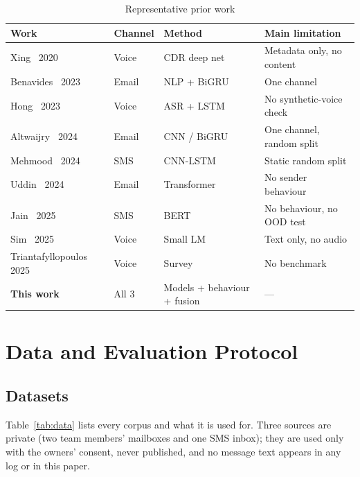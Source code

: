 \documentclass[conference]{IEEEtran}
\begin{document}
\begin{table}[t]
\caption{Representative prior work}
\label{tab:related}
\centering\footnotesize
\setlength{\tabcolsep}{3pt}
\begin{tabular}{@{}p{2.25cm}p{0.95cm}p{1.75cm}p{2.6cm}@{}}
\toprule
Work & Channel & Method & Main limitation \\
\midrule
Xing~\cite{xing2020fraudcall} 2020 & Voice & CDR deep net & Metadata only, no content \\
Benavides~\cite{benavides2023phishing} 2023 & Email & NLP + BiGRU & One channel \\
Hong~\cite{hong2023scamcalls} 2023 & Voice & ASR + LSTM & No synthetic-voice check \\
Altwaijry~\cite{altwaijry2024advancing} 2024 & Email & CNN / BiGRU & One channel, random split \\
Mehmood~\cite{mehmood2024smishing} 2024 & SMS & CNN-LSTM & Static random split \\
Uddin~\cite{uddin2024explainable} 2024 & Email & Transformer & No sender behaviour \\
Jain~\cite{jain2025smishing} 2025 & SMS & BERT & No behaviour, no OOD test \\
Sim~\cite{sim2025slm} 2025 & Voice & Small LM & Text only, no audio \\
Triantafyllopoulos~\cite{triantafyllopoulos2025vishing} 2025 & Voice & Survey & No benchmark \\
\midrule
\textbf{This work} & All 3 & Models + behaviour + fusion & --- \\
\bottomrule
\end{tabular}
\end{table}

\section{Data and Evaluation Protocol}\label{sec:data}

\subsection{Datasets}
Table~\ref{tab:data} lists every corpus and what it is used for. Three
sources are private (two team members' mailboxes and one SMS inbox); they
are used only with the owners' consent, never published, and no message text
appears in any log or in this paper.
\end{document}
